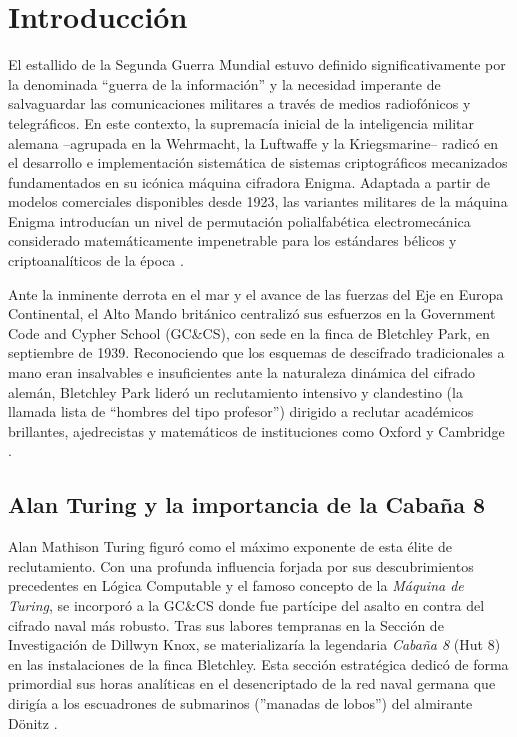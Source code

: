 \section{Introducción}

El estallido de la Segunda Guerra Mundial estuvo definido significativamente por la denominada ``guerra de la información'' y la necesidad imperante de salvaguardar las comunicaciones militares a través de medios radiofónicos y telegráficos. En este contexto, la supremacía inicial de la inteligencia militar alemana --agrupada en la Wehrmacht, la Luftwaffe y la Kriegsmarine-- radicó en el desarrollo e implementación sistemática de sistemas criptográficos mecanizados fundamentados en su icónica máquina cifradora Enigma. Adaptada a partir de modelos comerciales disponibles desde 1923, las variantes militares de la máquina Enigma introducían un nivel de permutación polialfabética electromecánica considerado matemáticamente impenetrable para los estándares bélicos y criptoanalíticos de la época \cite{copeland2006colossus}. 

Ante la inminente derrota en el mar y el avance de las fuerzas del Eje en Europa Continental, el Alto Mando británico centralizó sus esfuerzos en la Government Code and Cypher School (GC\&CS), con sede en la finca de Bletchley Park, en septiembre de 1939. Reconociendo que los esquemas de descifrado tradicionales a mano eran insalvables e insuficientes ante la naturaleza dinámica del cifrado alemán, Bletchley Park lideró un reclutamiento intensivo y clandestino (la llamada lista de ``hombres del tipo profesor'') dirigido a reclutar académicos brillantes, ajedrecistas y matemáticos de instituciones como Oxford y Cambridge \cite{copeland2004essential}.

\subsection{Alan Turing y la importancia de la Cabaña 8}

Alan Mathison Turing figuró como el máximo exponente de esta élite de reclutamiento. Con una profunda influencia forjada por sus descubrimientos precedentes en Lógica Computable y el famoso concepto de la \textit{Máquina de Turing}, se incorporó a la GC\&CS donde fue partícipe del asalto en contra del cifrado naval más robusto. Tras sus labores tempranas en la Sección de Investigación de Dillwyn Knox, se materializaría la legendaria \textit{Cabaña 8} (Hut 8) en las instalaciones de la finca Bletchley. Esta sección estratégica dedicó de forma primordial sus horas analíticas en el desencriptado de la red naval germana que dirigía a los escuadrones de submarinos (''manadas de lobos'') del almirante Dönitz \cite{copeland2004essential, hodges2014turing}. 

